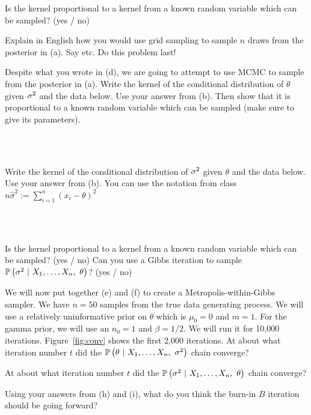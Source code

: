 \documentclass[12pt]{article}
\begin{document}
 Is the kernel proportional to a kernel from a known random variable which can be sampled?  (yes / no)  %

 Explain in English how you would use grid sampling to sample $n$ draws from the posterior in (a). Say   etc. Do this problem last!  %

 Despite what you wrote in (d), we are going to attempt to use MCMC to sample from the posterior in (a). Write the kernel of the conditional distribution of $\theta$ given $\sigma^2$ and the data below. Use your answer from (b). Then show that it is proportional to a known random variable which can be sampled (make sure to give its parameters).

\beqn
\cprob{\theta}{\Xoneton, ~\sigsq} \propto~~~~~~~~~~~~~~~~~~~~~~~~~~~~~~~~~~~~~~~~~~~~~~~~~~~~~~~~~~~~~~~~~~~~~~~~~~~~~~~~~
\eeqn~  %

 Write the kernel of the conditional distribution of $\sigma^2$ given $\theta$ and the data below. Use your answer from (b). You can use the notation from class $n\hat{\sigma}^2 := \sum_{i=1}^n (x_i - \theta)^2$ 

\beqn
\cprob{\sigsq}{\Xoneton,~ \theta} \propto~~~~~~~~~~~~~~~~~~~~~~~~~~~~~~~~~~~~~~~~~~~~~~~~~~~~~~~~~~~~~~~~~~~~~~~~~~~~~~~~~
\eeqn~ %

 Is the kernel proportional to a kernel from a known random variable which can be sampled?  (yes / no) Can you use a Gibbs iteration to sample $\mathbb{P}\left(\sigma^2~|~X_1, \ldots, X_n,~ \theta\right)$? (yes / no)%

 We will now put together (e) and (f) to create a Metropolis-within-Gibbs sampler. We have $n=50$ samples from the true data generating process. We will use a relatively uninformative prior on $\theta$ which is $\mu_0 = 0$ and $m = 1$. For the gamma prior, we will use an  $n_0 = 1$ and $\beta = 1/2$. We will run it for 10,000 iterations. Figure~\ref{fig:conv} shows the first 2,000 iterations. At about what iteration number $t$ did the $\mathbb{P}\left(\theta~|~X_1, \ldots, X_n, ~\sigma^2\right)$ chain converge?



 At about what  iteration number $t$ did the $\mathbb{P}\left(\sigma^2~|~X_1, \ldots, X_n, ~\theta\right)$ chain converge? %

 Using your answers from (h) and (i), what do you think the burn-in $B$ iteration should be going forward? %
\end{document}
